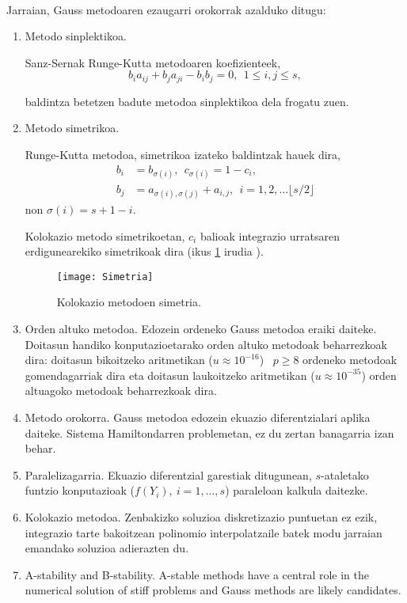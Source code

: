 \paragraph*{}Jarraian, Gauss metodoaren ezaugarri orokorrak azalduko ditugu:  
\begin{enumerate}
\item{Metodo sinplektikoa.}

Sanz-Sernak  \cite{JMSanz-Serna1994}  Runge-Kutta metodoaren koefizienteek,  
\begin{equation}
\label{eq:simplektik}
b_{i}a_{ij}+b_{j}a_{ji}-b_{i}b_{j}=0, \ \ 1 \leqslant i,j \leqslant s,
\end{equation}

baldintza betetzen badute metodoa sinplektikoa dela frogatu zuen.  
 
\item{Metodo simetrikoa.}

Runge-Kutta metodoa, simetrikoa izateko baldintzak hauek dira,
\begin{align*}
\label {eq:2}
 b_{i} &= b_{\sigma(i)} ,\ \  c_{\sigma(i)}= 1-c_{i}, \\
 b_{j} &= a_{\sigma(i),\sigma(j)}+a_{i,j}, \ \  i=1,2,\dots \lfloor s/2\rfloor
 \end{align*} 
non $\sigma(i)=s+1-i$.

Kolokazio metodo simetrikoetan, $c_i$ balioak integrazio urratsaren erdigunearekiko simetrikoak dira (ikus \ref{fig:simetrikoa} irudia  ).  
 \begin{figure}[h]
 \centering
 \texttt{[image: Simetria]}
 \caption{ \small Kolokazio metodoen simetria.}
 \label{fig:simetrikoa}
 \end{figure}
 
\item{Orden altuko metodoa.}
Edozein ordeneko Gauss metodoa eraiki daiteke. Doitasun handiko konputazioetarako orden altuko metodoak beharrezkoak dira: doitasun bikoitzeko aritmetikan ($u\approx10^{-16}$) ~$p\ge8$ ordeneko metodoak gomendagarriak dira eta doitasun laukoitzeko aritmetikan ($u\approx10^{-35}$) orden altuagoko metodoak beharrezkoak dira.  

\item{Metodo orokorra.}
Gauss metodoa edozein ekuazio diferentzialari aplika daiteke. Sistema Hamiltondarren problemetan, ez du zertan banagarria izan behar.

\item{Paralelizagarria.}
Ekuazio diferentzial garestiak ditugunean, $s$-ataletako funtzio konputazioak ($f(Y_i), \ i=1,\dots,s$) paraleloan kalkula daitezke.  

\item{Kolokazio metodoa.}
Zenbakizko soluzioa diskretizazio puntuetan ez ezik, integrazio tarte bakoitzean polinomio interpolatzaile batek modu jarraian emandako soluzioa adierazten du.

\item{A-stability and B-stability.}
A-stable methods have a central role in the numerical solution of stiff problems and Gauss methods are likely candidates.
  
\end{enumerate}

